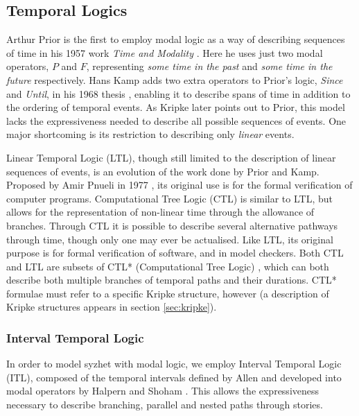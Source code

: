 \documentclass{llncs}
\def\mnote#1{\todo[color=Goldenrod,size=\scriptsize]{Matt: #1}}
\begin{document}
\mnote{Why use modal logic for possible worlds?}

\subsection{Temporal Logics}
Arthur Prior is the first to employ modal logic as a way of describing sequences of time in his 1957 work \emph{Time and Modality} \cite{prior2003time}. Here he uses just two modal operators, $P$ and $F$, representing \emph{some time in the past} and \emph{some time in the future} respectively.
Hans Kamp adds two extra operators to Prior's logic, \emph{Since} and \emph{Until}, in his 1968 thesis \cite{kamp1968tense}, enabling it to describe spans of time in addition to the ordering of temporal events.
As Kripke later points out to Prior, this model lacks the expressiveness needed to describe all possible sequences of events. One major shortcoming is its restriction to describing only \emph{linear} events. 

Linear Temporal Logic (LTL), though still limited to the description of linear sequences of events, is an evolution of the work done by Prior and Kamp. Proposed by Amir Pnueli in 1977 \cite{pnueli1977temporal}, its original use is for the formal verification of computer programs.
Computational Tree Logic (CTL) \cite{ben1983temporal} is similar to LTL, but allows for the representation of non-linear time through the allowance of branches. Through CTL it is possible to describe several alternative pathways through time, though only one may ever be actualised. Like LTL, its original purpose is for formal verification of software, and in model checkers.
Both CTL and LTL are subsets of CTL* (Computational Tree Logic) \cite{emerson1986sometimes}, which can both describe both multiple branches of temporal paths and their durations. CTL* formulae must refer to a specific Kripke structure, however (a description of Kripke structures appears in section \ref{sec:kripke}).

\subsubsection{Interval Temporal Logic}
In order to model syzhet with modal logic, we employ Interval Temporal Logic (ITL), composed of the temporal intervals defined by Allen \cite{allen1983maintaining} and developed into modal operators by Halpern and Shoham \cite{halpern1991propositional}. This allows the expressiveness necessary to describe branching, parallel and nested paths through stories.
\end{document}
